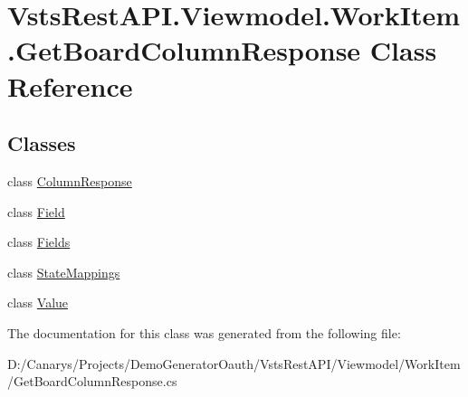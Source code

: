 \hypertarget{class_vsts_rest_a_p_i_1_1_viewmodel_1_1_work_item_1_1_get_board_column_response}{}\section{Vsts\+Rest\+A\+P\+I.\+Viewmodel.\+Work\+Item.\+Get\+Board\+Column\+Response Class Reference}
\label{class_vsts_rest_a_p_i_1_1_viewmodel_1_1_work_item_1_1_get_board_column_response}
\subsection*{Classes}
\begin{DoxyCompactItemize}
\item 
class \mbox{\hyperlink{class_vsts_rest_a_p_i_1_1_viewmodel_1_1_work_item_1_1_get_board_column_response_1_1_column_response}{Column\+Response}}
\item 
class \mbox{\hyperlink{class_vsts_rest_a_p_i_1_1_viewmodel_1_1_work_item_1_1_get_board_column_response_1_1_field}{Field}}
\item 
class \mbox{\hyperlink{class_vsts_rest_a_p_i_1_1_viewmodel_1_1_work_item_1_1_get_board_column_response_1_1_fields}{Fields}}
\item 
class \mbox{\hyperlink{class_vsts_rest_a_p_i_1_1_viewmodel_1_1_work_item_1_1_get_board_column_response_1_1_state_mappings}{State\+Mappings}}
\item 
class \mbox{\hyperlink{class_vsts_rest_a_p_i_1_1_viewmodel_1_1_work_item_1_1_get_board_column_response_1_1_value}{Value}}
\end{DoxyCompactItemize}


The documentation for this class was generated from the following file\+:\begin{DoxyCompactItemize}
\item 
D\+:/\+Canarys/\+Projects/\+Demo\+Generator\+Oauth/\+Vsts\+Rest\+A\+P\+I/\+Viewmodel/\+Work\+Item/Get\+Board\+Column\+Response.\+cs\end{DoxyCompactItemize}
